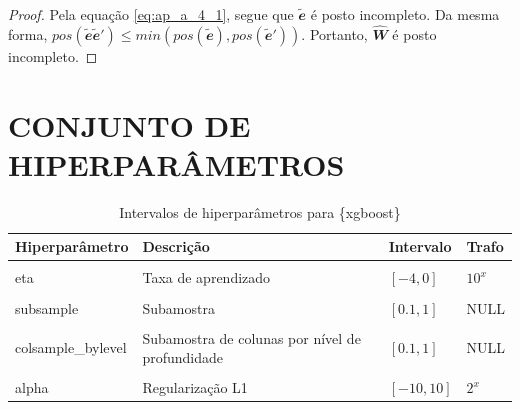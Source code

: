 \documentclass[
  12pt,
  twoside,
  openright,
  a4paper,
  chapter=TITLE,
  section=TITLE,
  brazil]{abntex2}
\begin{document}
\begin{apendicesenv}
\begin{proof}
  Pela equação \eqref{eq:ap_a_4_1}, segue que $\mathbfit{\tilde{e}}$ é posto incompleto. Da mesma forma, $pos(\mathbfit{\tilde{e}\tilde{e}'}) \leq min(pos(\mathbfit{\tilde{e}}), pos(\mathbfit{\tilde{e}'}))$. Portanto, $\mathbfit{\hat{W}}$ é posto incompleto.
\end{proof}

\chapter{CONJUNTO DE HIPERPARÂMETROS} \label{apendice_hiperparametros}

\begin{table}

  \caption{\label{tab:tbl-hip-xgboost}Intervalos de hiperparâmetros para \{xgboost\}}
  \centering
  \begin{tabular}[t]{llll}
  \toprule
  Hiperparâmetro & Descrição & Intervalo & Trafo\\
  \midrule
  \cellcolor{gray!6}{nrounds} & \cellcolor{gray!6}{Número de iterações} & \cellcolor{gray!6}{$[1, 5000]$} & \cellcolor{gray!6}{NULL}\\
  eta & Taxa de aprendizado & $[-4, 0]$ & $10^x$\\
  \cellcolor{gray!6}{max\_depth} & \cellcolor{gray!6}{Profundidade máxima} & \cellcolor{gray!6}{$[1, 20]$} & \cellcolor{gray!6}{NULL}\\
  subsample & Subamostra & $[0.1, 1]$ & NULL\\
  \cellcolor{gray!6}{colsample\_bytree} & \cellcolor{gray!6}{Subamostra de colunas para uma árvore} & \cellcolor{gray!6}{$[0.1, 1]$} & \cellcolor{gray!6}{NULL}\\
  \addlinespace
  colsample\_bylevel & Subamostra de colunas por nível de profundidade & $[0.1, 1]$ & NULL\\
  \cellcolor{gray!6}{lambda} & \cellcolor{gray!6}{Regularização L2} & \cellcolor{gray!6}{$[-10, 10]$} & \cellcolor{gray!6}{$2^x$}\\
  alpha & Regularização L1 & $[-10, 10]$ & $2^x$\\
  \bottomrule
  \end{tabular}
\end{table}

\begin{table}


\end{table}
\end{apendicesenv}
\end{document}
